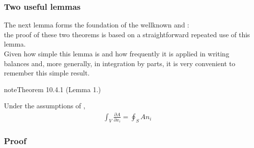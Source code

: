 \documentclass[letterpaper,10pt,english]{jupyterBook}
\begin{document}
\subsubsection{Two useful lemmas}
\label{\detokenize{ch/tensor-algebra-calculus/calculus-euclidean:two-useful-lemmas}}
\sphinxAtStartPar
The next lemma forms the foundation of the well\sphinxhyphen{}known {\hyperref[\detokenize{ch/tensor-algebra-calculus/calculus-euclidean:tensor-calculus-integrals-theorems-divergence}]{}} and {\hyperref[\detokenize{ch/tensor-algebra-calculus/calculus-euclidean:tensor-calculus-integrals-theorems-gradient}]{}}:\\
the proof of these two theorems is based on a straightforward repeated use of this lemma.\\
Given how simple this lemma is and how frequently it is applied in writing balances and, more generally, in integration by parts, it is very convenient to remember this simple result.
\label{ch/tensor-algebra-calculus/calculus-euclidean:lemma-1}
\begin{sphinxadmonition}{note}{Theorem 10.4.1 (Lemma 1.)}



\sphinxAtStartPar
Under the assumptions of {\hyperref[\detokenize{ch/multivariable/intro:multivariable-calculus-green-lemma}]{}},
\begin{equation*}
\begin{split}
  \int_V \frac{\partial A}{\partial x_i} = \oint_S A n_i
\end{split}
\end{equation*}\end{sphinxadmonition}
\subsubsection*{Proof}
\end{document}
